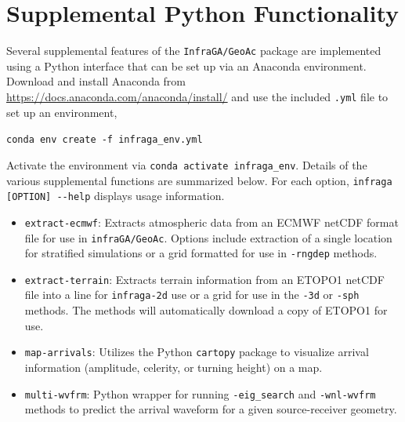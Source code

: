 \documentclass[10pt]{article}
\begin{document}
\newpage
\section{Supplemental Python Functionality}
\label{Sect:Python}

Several supplemental features of the \verb=InfraGA/GeoAc= package are implemented using a Python interface that can be set up via an Anaconda environment.  Download and install Anaconda from \url{https://docs.anaconda.com/anaconda/install/} and use the included \verb=.yml= file to set up an environment,
\begin{center}
 \verb=conda env create -f infraga_env.yml=
\end{center}
Activate the environment via \verb=conda activate infraga_env=.  Details of the various supplemental functions are summarized below.  For each option, \verb=infraga [OPTION] --help= displays usage information.
\begin{itemize}
 \item \verb=extract-ecmwf=: Extracts atmospheric data from an ECMWF netCDF format file for use in \verb=infraGA/GeoAc=.  Options include extraction of a single location for stratified simulations or a grid formatted for use in \verb=-rngdep= methods. 

 \item \verb=extract-terrain=: Extracts terrain information from an ETOPO1 netCDF file into a line for \verb=infraga-2d= use or a grid for use in the \verb=-3d= or \verb=-sph= methods. The methods will automatically download a copy of ETOPO1 for use.

 \item \verb=map-arrivals=: Utilizes the Python \verb=cartopy= package to visualize arrival information (amplitude, celerity, or turning height) on a map.  

 \item \verb=multi-wvfrm=: Python wrapper for running \verb=-eig_search= and \verb=-wnl-wvfrm= methods to predict the arrival waveform for a given source-receiver geometry.
 
 
\end{itemize}



\newpage
\end{document}
